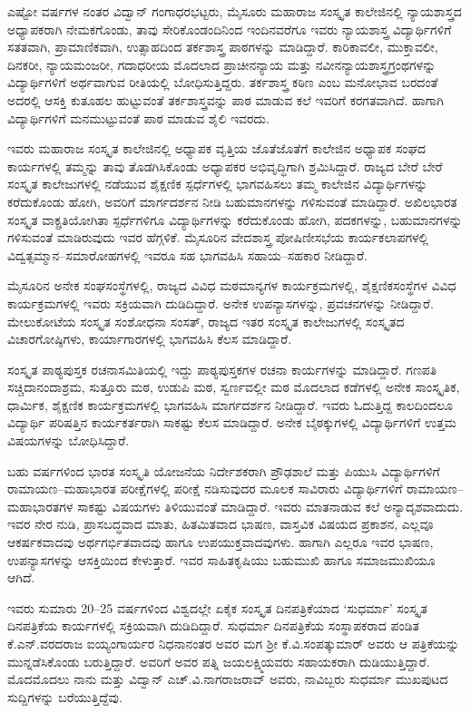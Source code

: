 {ಎಷ್ಟೋ ವರ್ಷಗಳ ನಂತರ ವಿದ್ವಾನ್ ಗಂಗಾಧರಭಟ್ಟರು, ಮೈಸೂರು ಮಹಾರಾಜ ಸಂಸ್ಕೃತ ಕಾಲೇಜಿನಲ್ಲಿ ನ್ಯಾಯಶಾಸ್ತ್ರದ ಅಧ್ಯಾಪಕರಾಗಿ ನೇಮಕಗೊಂಡು, ತಾವು ಸೇರಿಕೊಂಡಂದಿನಿಂದ ಇಂದಿನವರೆಗೂ ಇವರು ನ್ಯಾಯಶಾಸ್ತ್ರ ವಿದ್ಯಾರ್ಥಿಗಳಿಗೆ ಸತತವಾಗಿ, ಪ್ರಾಮಾಣಿಕವಾಗಿ, ಉತ್ಸಾಹದಿಂದ ತರ್ಕಶಾಸ್ತ್ರ ಪಾಠಗಳನ್ನು ಮಾಡಿದ್ದಾರೆ. ಕಾರಿಕಾವಲೀ, ಮುಕ್ತಾವಲೀ, ದಿನಕರೀ, ನ್ಯಾಯಮಂಜರೀ, ಗದಾಧರೀಯ ಮೊದಲಾದ ಪ್ರಾಚೀನನ್ಯಾಯ ಮತ್ತು ನವೀನನ್ಯಾಯಶಾಸ್ತ್ರಗ್ರಂಥಗಳನ್ನು ವಿದ್ಯಾರ್ಥಿಗಳಿಗೆ ಅರ್ಥವಾಗುವ ರೀತಿಯಲ್ಲಿ ಬೋಧಿಸುತ್ತಿದ್ದರು. ತರ್ಕಶಾಸ್ತ್ರ ಕಠಿಣ ಎಂಬ ಮನೋಭಾವ ಬರದಂತೆ ಅದರಲ್ಲಿ ಆಸಕ್ತಿ ಕುತೂಹಲ ಹುಟ್ಟುವಂತೆ ತರ್ಕಶಾಸ್ತ್ರವನ್ನು ಪಾಠ ಮಾಡುವ ಕಲೆ ಇವರಿಗೆ ಕರಗತವಾಗಿದೆ. ಹಾಗಾಗಿ ವಿದ್ಯಾರ್ಥಿಗಳಿಗೆ ಮನಮುಟ್ಟುವಂತೆ ಪಾಠ ಮಾಡುವ ಶೈಲಿ ಇವರದು.

ಇವರು ಮಹಾರಾಜ ಸಂಸ್ಕೃತ ಕಾಲೇಜಿನಲ್ಲಿ ಅಧ್ಯಾಪಕ ವೃತ್ತಿಯ ಜೊತೆಜೊತೆಗೆ ಕಾಲೇಜಿನ ಅಧ್ಯಾಪಕ ಸಂಘದ ಕಾರ್ಯಗಳಲ್ಲಿ ತಮ್ಮನ್ನು ತಾವು ತೊಡಗಿಸಿಕೊಂಡು ಅಧ್ಯಾಪಕರ ಅಭಿವೃದ್ಧಿಗಾಗಿ ಶ್ರಮಿಸಿದ್ದಾರೆ. ರಾಜ್ಯದ ಬೇರೆ ಬೇರೆ ಸಂಸ್ಕೃತ ಕಾಲೇಜುಗಳಲ್ಲಿ ನಡೆಯುವ ಶೈಕ್ಷಣಿಕ ಸ್ಪರ್ಧೆಗಳಲ್ಲಿ ಭಾಗವಹಿಸಲು ತಮ್ಮ ಕಾಲೇಜಿನ ವಿದ್ಯಾರ್ಥಿಗಳನ್ನು ಕರೆದುಕೊಂಡು ಹೋಗಿ, ಅವರಿಗೆ ಮಾರ್ಗದರ್ಶನ ನೀಡಿ ಬಹುಮಾನಗಳನ್ನು ಗಳಿಸುವಂತೆ ಮಾಡಿದ್ದಾರೆ. ಅಖಿಲಭಾರತ ಸಂಸ್ಕೃತ ವಾಕ್ಪ್ರತಿಯೋಗಿತಾ ಸ್ಪರ್ಧೆಗಳಿಗೂ ವಿದ್ಯಾರ್ಥಿಗಳನ್ನು ಕರೆದುಕೊಂಡು ಹೋಗಿ, ಪದಕಗಳನ್ನು, ಬಹುಮಾನಗಳನ್ನು ಗಳಿಸುವಂತೆ ಮಾಡಿರುವುದು ಇವರ ಹೆಗ್ಗಳಿಕೆ. ಮೈಸೂರಿನ ವೇದಶಾಸ್ತ್ರ ಪೋಷಿಣೀಸಭೆಯ ಕಾರ್ಯಕಲಾಪಗಳಲ್ಲಿ ವಿದ್ವತ್ಸಮ್ಮಾನ–ಸಮಾರೋಹಗಳಲ್ಲಿ ಇವರೂ ಸಹ ಭಾಗವಹಿಸಿ ಸಹಾಯ–ಸಹಕಾರ ನೀಡಿದ್ದಾರೆ.

ಮೈಸೂರಿನ ಅನೇಕ ಸಂಘಸಂಸ್ಥೆಗಳಲ್ಲಿ, ರಾಜ್ಯದ ವಿವಿಧ ಮಠಮಾನ್ಯಗಳ ಕಾರ್ಯಕ್ರಮಗಳಲ್ಲಿ, ಶೈಕ್ಷಣಿಕಸಂಸ್ಥೆಗಳ ವಿವಿಧ ಕಾರ್ಯಕ್ರಮಗಳಲ್ಲಿ ಇವರು ಸಕ್ರಿಯವಾಗಿ ದುಡಿದಿದ್ದಾರೆ. ಅನೇಕ ಉಪನ್ಯಾಸಗಳನ್ನು, ಪ್ರವಚನಗಳನ್ನು ನೀಡಿದ್ದಾರೆ. ಮೇಲುಕೋಟೆಯ ಸಂಸ್ಕೃತ ಸಂಶೋಧನಾ ಸಂಸತ್, ರಾಜ್ಯದ ಇತರ ಸಂಸ್ಕೃತ ಕಾಲೇಜುಗಳಲ್ಲಿ ಸಂಸ್ಕೃತದ ವಿಚಾರಗೋಷ್ಠಿಗಳು, ಕಾರ್ಯಾಗಾರಗಳಲ್ಲಿ ಭಾಗವಹಿಸಿ ಕೆಲಸ ಮಾಡಿದ್ದಾರೆ. 

ಸಂಸ್ಕೃತ ಪಾಠ್ಯಪುಸ್ತಕ ರಚನಾಸಮಿತಿಯಲ್ಲಿ ಇದ್ದು ಪಾಠ್ಯಪುಸ್ತಕಗಳ ರಚನಾ ಕಾರ್ಯಗಳನ್ನು ಮಾಡಿದ್ದಾರೆ. ಗಣಪತಿ ಸಚ್ಚಿದಾನಂದಾಶ್ರಮ, ಸುತ್ತೂರು ಮಠ, ಉಡುಪಿ ಮಠ, ಸ್ವರ್ಣವಲ್ಲೀ ಮಠ ಮೊದಲಾದ ಕಡೆಗಳಲ್ಲಿ ಅನೇಕ ಸಾಂಸ್ಕೃತಿಕ, ಧಾರ್ಮಿಕ, ಶೈಕ್ಷಣಿಕ ಕಾರ್ಯಕ್ರಮಗಳಲ್ಲಿ ಭಾಗವಹಿಸಿ ಮಾರ್ಗದರ್ಶನ ನೀಡಿದ್ದಾರೆ. ಇವರು ಓದುತ್ತಿದ್ದ ಕಾಲದಿಂದಲೂ ವಿದ್ಯಾರ್ಥಿ ಪರಿಷತ್ತಿನ ಕಾರ್ಯಕರ್ತರಾಗಿ ಸಾಕಷ್ಟು ಕೆಲಸ ಮಾಡಿದ್ದಾರೆ. ಅನೇಕ ಬೈಠಕ್ಕುಗಳಲ್ಲಿ ವಿದ್ಯಾರ್ಥಿಗಳಿಗೆ ಉತ್ತಮ ವಿಷಯಗಳನ್ನು ಬೋಧಿಸಿದ್ದಾರೆ. 

ಬಹು ವರ್ಷಗಳಿಂದ ಭಾರತ ಸಂಸ್ಕೃತಿ ಯೋಜನೆಯ ನಿರ್ದೇಶಕರಾಗಿ ಪ್ರೌಢಶಾಲೆ ಮತ್ತು ಪಿಯುಸಿ ವಿದ್ಯಾರ್ಥಿಗಳಿಗೆ ರಾಮಾಯಣ–ಮಹಾಭಾರತ ಪರೀಕ್ಷೆಗಳಲ್ಲಿ ಪರೀಕ್ಷೆ ನಡಿಸುವುದರ ಮೂಲಕ ಸಾವಿರಾರು ವಿದ್ಯಾರ್ಥಿಗಳಿಗೆ ರಾಮಾಯಣ–ಮಹಾಭಾರತಗಳ ಸಾಕಷ್ಟು ವಿಷಯಗಳು ತಿಳಿಯುವಂತೆ ಮಾಡಿದ್ದಾರೆ. ಇವರು ಮಾತನಾಡುವ ಕಲೆ ಅನ್ಯಾದೃಶವಾದುದು. ಇವರ ನೇರ ನುಡಿ, ಪ್ರಾಸಬದ್ಧವಾದ ಮಾತು, ಹಿತಮಿತವಾದ ಭಾಷಣ, ವಾಸ್ತವಿಕ ವಿಷಯದ ಪ್ರಕಾಶನ, ಎಲ್ಲವೂ ಆಕರ್ಷಕವಾದವು ಅರ್ಥಗರ್ಭಿತವಾದವು ಹಾಗೂ ಉಪಯುಕ್ತವಾದವುಗಳು. ಹಾಗಾಗಿ ಎಲ್ಲರೂ ಇವರ ಭಾಷಣ, ಉಪನ್ಯಾಸಗಳನ್ನು ಆಸಕ್ತಿಯಿಂದ ಕೇಳುತ್ತಾರೆ. ಇವರ ಸಾಹಿತಕೃಷಿಯು ಬಹುಮುಖಿ ಹಾಗೂ ಸಮಾಜಮುಖಿಯೂ ಆಗಿದೆ.

ಇವರು ಸುಮಾರು 20–25 ವರ್ಷಗಳಿಂದ ವಿಶ್ವದಲ್ಲೇ ಏಕೈಕ ಸಂಸ್ಕೃತ ದಿನಪತ್ರಿಕೆಯಾದ ‘ಸುಧರ್ಮಾ’ ಸಂಸ್ಕೃತ ದಿನಪತ್ರಿಕೆಯ ಕಾರ್ಯಗಳಲ್ಲಿ ಸಕ್ರಿಯವಾಗಿ ದುಡಿದಿದ್ದಾರೆ. ಸುಧರ್ಮಾ ದಿನಪತ್ರಿಕೆಯ ಸಂಸ್ಥಾಪಕರಾದ ಪಂಡಿತ ಕೆ.ಎನ್.ವರದರಾಜ ಐಯ್ಯಂಗಾರ್ಯರ ನಿಧನಾನಂತರ ಅವರ ಮಗ ಶ್ರೀ ಕೆ.ವಿ.ಸಂಪತ್ಕುಮಾರ್ ಅವರು ಆ ಪತ್ರಿಕೆಯನ್ನು ಮುನ್ನಡೆಸಿಕೊಂಡು ಬರುತ್ತಿದ್ದಾರೆ. ಅವರಿಗೆ ಅವರ ಪತ್ನಿ ಜಯಲಕ್ಷ್ಮಿಯವರು ಸಹಾಯಕರಾಗಿ ದುಡಿಯುತ್ತಿದ್ದಾರೆ. ಮೊದಮೊದಲು ನಾನು ಮತ್ತು ವಿದ್ವಾನ್ ಎಚ್.ವಿ.ನಾಗರಾಜರಾವ್ ಅವರು, ನಾವಿಬ್ಬರು ಸುಧರ್ಮಾ ಮುಖಪುಟದ ಸುದ್ದಿಗಳನ್ನು ಬರೆಯುತ್ತಿದ್ದೆವು. 

}
